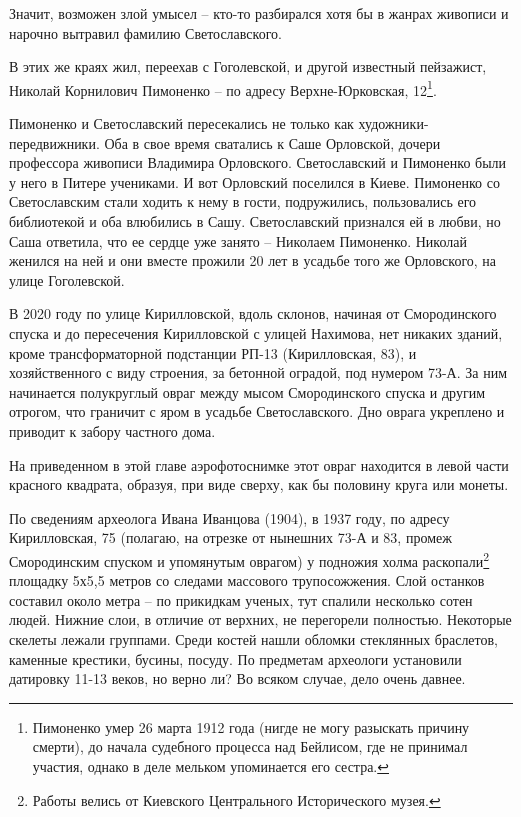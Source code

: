 Значит, возможен злой умысел – кто-то разбирался хотя бы в жанрах живописи и нарочно вытравил фамилию Светославского.

В этих же краях жил, переехав с Гоголевской, и другой известный пейзажист, Николай Корнилович Пимоненко – по адресу Верхне-Юрковская, 12\footnote{Пимоненко умер 26 марта 1912 года (нигде не могу разыскать причину смерти), до начала судебного процесса над Бейлисом, где не принимал участия, однако в деле мельком упоминается его сестра.}.

Пимоненко и Светославский пересекались не только как художники-передвижники. Оба в свое время сватались к Саше Орловской, дочери профессора живописи Владимира Орловского. Светославский и Пимоненко были у него в Питере учениками. И вот Орловский поселился в Киеве. Пимоненко со Светославским стали ходить к нему в гости, подружились, пользовались его библиотекой и оба влюбились в Сашу. Светославский признался ей в любви, но Саша ответила, что ее сердце уже занято – Николаем Пимоненко. Николай женился на ней и они вместе прожили 20 лет в усадьбе того же Орловского, на улице Гоголевской. 


В 2020 году по улице Кирилловской, вдоль склонов, начиная от Смородинского спуска и до пересечения Кирилловской с улицей Нахимова, нет никаких зданий, кроме трансформаторной подстанции РП-13 (Кирилловская, 83), и хозяйственного с виду строения, за бетонной оградой, под нумером 73-А. За ним начинается полукруглый овраг между мысом Смородинского спуска и другим отрогом, что граничит с яром в усадьбе Светославского. Дно оврага укреплено и приводит к забору частного дома.

На приведенном в этой главе аэрофотоснимке этот овраг находится в левой части красного квадрата, образуя, при виде сверху, как бы половину круга или монеты.

По сведениям \cite{ivancov} археолога Ивана Иванцова (1904), в 1937 году, по адресу Кирилловская, 75 (полагаю, на отрезке от нынешних 73-А и 83, промеж Смородинским спуском и упомянутым оврагом) у подножия холма раскопали\footnote{Работы велись от Киевского Центрального Исторического музея.} площадку 5х5,5 метров со следами массового трупосожжения. Слой останков составил около метра – по прикидкам ученых, тут спалили несколько сотен людей. Нижние слои, в отличие от верхних, не перегорели полностью. Некоторые скелеты лежали группами. Среди костей нашли обломки стеклянных браслетов, каменные крестики, бусины, посуду. По предметам археологи установили датировку 11-13 веков, но верно ли? Во всяком случае, дело очень давнее.

